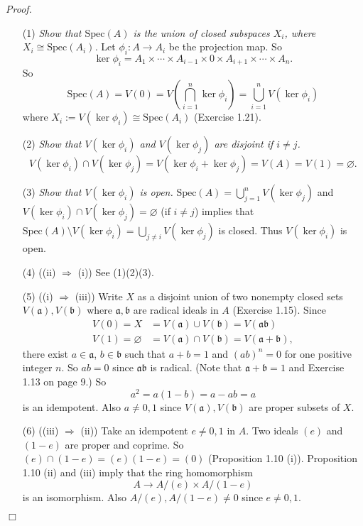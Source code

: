 \documentclass{article}
\begin{document}
\emph{Proof.}
\begin{enumerate}
\item[(1)]
  \emph{Show that $\mathrm{Spec}(A)$ is the union of closed subspaces $X_i$,
  where $X_i \cong \mathrm{Spec}(A_i)$.}
  Let $\phi_i: A \to A_i$ be the projection map.
  So
  \[
    \ker\phi_i
    = A_1 \times \cdots \times A_{i-1} \times 0 \times A_{i+1} \times \cdots \times A_n.
  \]
  So
  \[
    \mathrm{Spec}(A)
    = V(0)
    = V\left( \bigcap_{i=1}^{n} \ker\phi_i \right)
    = \bigcup_{i=1}^{n} V(\ker\phi_i)
  \]
  where $X_i := V(\ker\phi_i) \cong \mathrm{Spec}(A_i)$ (Exercise 1.21).

\item[(2)]
  \emph{Show that $V(\ker\phi_i)$ and $V(\ker\phi_j)$ are disjoint if $i \neq j$.}
  \[
    V(\ker\phi_i) \cap V(\ker\phi_j)
    = V(\ker\phi_i + \ker\phi_j)
    = V(A)
    = V(1) = \varnothing.
  \]

\item[(3)]
  \emph{Show that $V(\ker\phi_i)$ is open.}
  $\mathrm{Spec}(A) = \bigcup_{j=1}^{n} V(\ker\phi_j)$
  and $V(\ker\phi_i) \cap V(\ker\phi_j) = \varnothing$ (if $i \neq j$)
  implies that $\mathrm{Spec}(A) \setminus V(\ker\phi_i) = \bigcup_{j \neq i} V(\ker\phi_j)$ is closed.
  Thus  $V(\ker\phi_i)$ is open.

\item[(4)]
  ((ii) $\Longrightarrow$ (i))
  See (1)(2)(3).

\item[(5)]
  ((i) $\Longrightarrow$ (iii))
  Write $X$ as a disjoint union of two nonempty closed sets $V(\mathfrak{a}), V(\mathfrak{b})$
  where $\mathfrak{a}, \mathfrak{b}$ are radical ideals in $A$ (Exercise 1.15).
  Since
  \begin{align*}
    V(0) = X &= V(\mathfrak{a}) \cup V(\mathfrak{b}) = V(\mathfrak{a} \mathfrak{b}) \\
    V(1) = \varnothing &= V(\mathfrak{a}) \cap V(\mathfrak{b}) = V(\mathfrak{a} + \mathfrak{b}),
  \end{align*}
  there exist $a \in \mathfrak{a}$, $b \in \mathfrak{b}$ such that $a+b = 1$ and $(ab)^n = 0$
  for one positive integer $n$.
  So $ab = 0$ since $\mathfrak{a} \mathfrak{b}$ is radical.
  (Note that $\mathfrak{a} + \mathfrak{b} = 1$ and Exercise 1.13 on page 9.)
  So
  \[
    a^2 = a(1 - b) = a - ab = a
  \]
  is an idempotent.
  Also $a \neq 0, 1$ since $V(\mathfrak{a}), V(\mathfrak{b})$ are proper subsets of $X$.

\item[(6)]
  ((iii) $\Longrightarrow$ (ii))
  Take an idempotent $e \neq 0, 1$ in $A$.
  Two ideals $(e)$ and $(1-e)$ are proper and coprime.
  So $(e) \cap (1-e) = (e)(1-e) = (0)$ (Proposition 1.10 (i)).
  Proposition 1.10 (ii) and (iii) imply that the ring homomorphism
  \[
    A \to A/(e) \times A/(1-e)
  \]
  is an isomorphism.
  Also $A/(e), A/(1-e) \neq 0$ since $e \neq 0, 1$.
\end{enumerate}
$\Box$ \\\\
\end{document}
